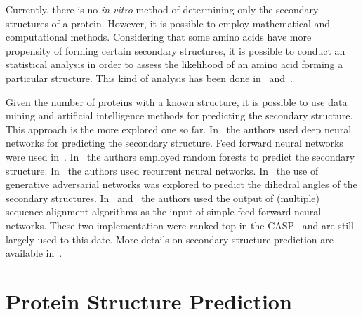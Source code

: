 Currently, there is no \textit{in vitro} method of determining only the
secondary structures of a protein. However, it is possible to employ
mathematical and computational methods. Considering that some amino acids have
more propensity of forming certain secondary structures, it is possible to
conduct an statistical analysis in order to assess the likelihood of an amino
acid forming a particular structure. This kind of analysis has been done
in~\cite{dunbrack1993backbone} and~\cite{borguesan2015apl}.

Given the number of proteins with a known structure, it is possible to use data
mining and artificial intelligence methods for predicting the secondary
structure. This approach is the more explored one so far.
In~\cite{wang2016protein} the authors used deep neural networks for predicting
the secondary structure. Feed forward neural networks were used
in~\cite{meng2016computational}. In~\cite{kathuria2018predicting} the authors
employed random forests to predict the secondary structure.
In~\cite{baldi1999exploiting} the authors used recurrent neural networks.
In~\cite{kim2018dihedral} the use of generative adversarial networks was
explored to predict the dihedral angles of the secondary structures.
In~\cite{pollastri2002improving} and~\cite{mcguffin2000psipred} the authors
used the output of (multiple) sequence alignment algorithms as the input of
simple feed forward neural networks. These two implementation were ranked top
in the \ac{CASP}~\cite{moult1999critical} and are still largely used to this
date. More details on secondary structure prediction are available
in~\cite{jiang2017protein}.


\section{Protein Structure Prediction}
\label{sec:psp}
\label{sec:pspp}
\label{sec:protein-structure}



